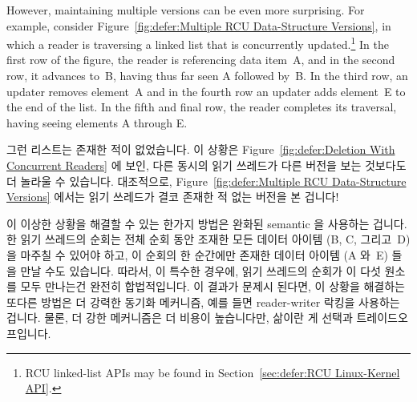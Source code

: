 However, maintaining multiple versions can be even more surprising.
For example, consider
Figure~\ref{fig:defer:Multiple RCU Data-Structure Versions},
in which a reader is traversing a linked list that is concurrently
updated.\footnote{
	RCU linked-list APIs may be found in
	Section~\ref{sec:defer:RCU Linux-Kernel API}.}
In the first row of the figure, the reader is referencing data item~A,
and in the second row, it advances to~B, having thus far seen A followed by~B.
In the third row, an updater removes element~A and in the fourth row
an updater adds element~E to the end of the list.
In the fifth and final row, the reader completes its traversal, having
seeing elements A through E.
\fi

그런 리스트는 존재한 적이 없었습니다.
이 상황은
Figure~\ref{fig:defer:Deletion With Concurrent Readers} 에 보인, 다른 동시의
읽기 쓰레드가 다른 버전을 보는 것보다도 더 놀라울 수 있습니다.
대조적으로,
Figure~\ref{fig:defer:Multiple RCU Data-Structure Versions} 에서는 읽기
쓰레드가 결코 존재한 적 없는 버전을 본 겁니다!

이 이상한 상황을 해결할 수 있는 한가지 방법은 완화된 semantic 을 사용하는
겁니다.
한 읽기 쓰레드의 순회는 전체 순회 동안 조재한 모든 데이터 아이템 (B, C,
그리고~D) 을 마주칠 수 있어야 하고, 이 순회의 한 순간에만 존재한 데이터 아이템
(A 와~E) 들을 만날 수도 있습니다.
따라서, 이 특수한 경우에, 읽기 쓰레드의 순회가 이 다섯 원소를 모두 만나는건
완전히 합법적입니다.
이 결과가 문제시 된다면, 이 상황을 해결하는 또다른 방법은 더 강력한 동기화
메커니즘, 예를 들면 reader-writer 락킹을 사용하는 겁니다.
물론, 더 강한 메커니즘은 더 비용이 높습니다만, 삶이란 게 선택과
트레이드오프입니다.

